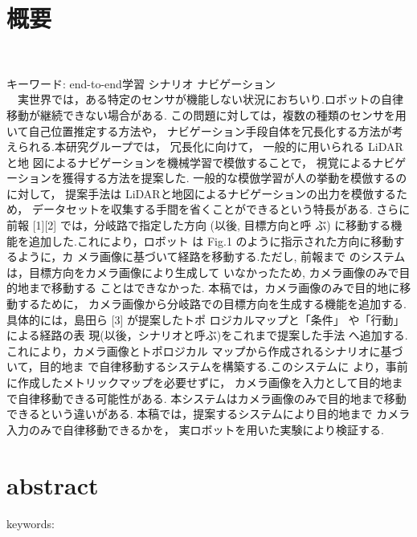 \chapter*{概要}
\thispagestyle{empty}
%
\begin{center}
  \scalebox{1.5}{タイトル}\\
\end{center}
\vspace{1.0zh}
%


キーワード: end-to-end学習 シナリオ ナビゲーション \\
%
　実世界では，ある特定のセンサが機能しない状況におちいり.ロボットの自律移動が継続できない場合がある.
この問題に対しては，複数の種類のセンサを用いて自己位置推定する方法や，
ナビゲーション手段自体を冗長化する方法が考えられる.本研究グループでは，
冗長化に向けて，
一般的に用いられる LiDAR と地 図によるナビゲーションを機械学習で模倣することで，
視覚によるナビゲーションを獲得する方法を提案した.
一般的な模倣学習が人の挙動を模倣するのに対して，
提案手法は LiDARと地図によるナビゲーションの出力を模倣するため，
データセットを収集する手間を省くことができるという特長がある.
さらに前報 [1][2] では，分岐路で指定した方向 (以後, 目標方向と呼 ぶ) に移動する機能を追加した.これにより，ロボット は Fig.1 のように指示された方向に移動するように，カ メラ画像に基づいて経路を移動する.ただし, 前報まで のシステムは，目標方向をカメラ画像により生成して いなかったため, カメラ画像のみで目的地まで移動する ことはできなかった.
本稿では，カメラ画像のみで目的地に移動するために，
カメラ画像から分岐路での目標方向を生成する機能を追加する.
具体的には，島田ら [3] が提案したトポ ロジカルマップと「条件」
や「行動」による経路の表 現(以後，シナリオと呼ぶ)をこれまで提案した手法
へ追加する.これにより，カメラ画像とトポロジカル マップから作成されるシナリオに基づいて，目的地ま で自律移動するシステムを構築する.このシステムに より，事前に作成したメトリックマップを必要せずに，
カメラ画像を入力として目的地まで自律移動できる可能性がある.
本システムはカメラ画像のみで目的地まで移動できるという違いがある.
本稿では，提案するシステムにより目的地まで
カメラ入力のみで自律移動できるかを，
実ロボットを用いた実験により検証する.
\newpage
\chapter*{abstract}
\thispagestyle{empty}
%
\begin{center}
  \scalebox{1.3}{title}
\end{center}
\vspace{1.0zh}
%


keywords: 
